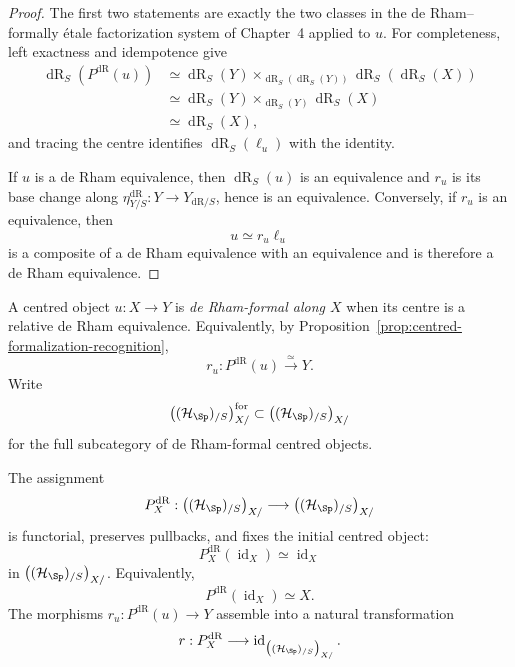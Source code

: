 \begin{proof}
The first two statements are exactly the two classes in the
de Rham--formally \'etale factorization system of Chapter~4 applied to
$u$.  For completeness, left exactness and idempotence give
\[
\begin{aligned}
    \operatorname{dR}_S(P^{\mathrm{dR}}(u))
    &\simeq
    \operatorname{dR}_S(Y)
    \times_{\operatorname{dR}_S(\operatorname{dR}_S(Y))}
    \operatorname{dR}_S(\operatorname{dR}_S(X))\\
    &\simeq
    \operatorname{dR}_S(Y)
    \times_{\operatorname{dR}_S(Y)}
    \operatorname{dR}_S(X)\\
    &\simeq
    \operatorname{dR}_S(X),
\end{aligned}
\]
and tracing the centre identifies
$\operatorname{dR}_S(\ell_u)$ with the identity.

If $u$ is a de Rham equivalence, then
$\operatorname{dR}_S(u)$ is an equivalence and $r_u$ is its base change along
$\eta_{Y/S}^{\mathrm{dR}}:Y\to Y_{\mathrm{dR}/S}$, hence is an equivalence.  Conversely, if
$r_u$ is an equivalence, then
\[
    u\simeq r_u\ell_u
\]
is a composite of a de Rham equivalence with an equivalence and is therefore a
de Rham equivalence.
\end{proof}

\begin{definition}
\label{def:centred-formal-object}
A centred object $u:X\to Y$ is \emph{de Rham-formal along $X$} when its centre
is a relative de Rham equivalence.  Equivalently, by
Proposition~\ref{prop:centred-formalization-recognition},
\[
    r_u:P^{\mathrm{dR}}(u)\xrightarrow{\simeq}Y.
\]
Write
\[
    \bigl((\mathcal H_{\Sp})_{/S}\bigr)_{X/}^{\mathrm{for}}
    \subset
    \bigl((\mathcal H_{\Sp})_{/S}\bigr)_{X/}
\]
for the full subcategory of de Rham-formal centred objects.
\end{definition}

\begin{proposition}
\label{prop:centred-formalization-pullbacks}
The assignment
\[
    P_X^{\mathrm{dR}}:\bigl((\mathcal H_{\Sp})_{/S}\bigr)_{X/}\longrightarrow\bigl((\mathcal H_{\Sp})_{/S}\bigr)_{X/}
\]
is functorial, preserves pullbacks, and fixes the initial centred object:
\[
    P_X^{\mathrm{dR}}(\operatorname{id}_X)
    \simeq
    \operatorname{id}_X
\]
in \(\bigl((\mathcal H_{\Sp})_{/S}\bigr)_{X/}\).  Equivalently,
\[
    P^{\mathrm{dR}}(\operatorname{id}_X)\simeq X.
\]
The morphisms $r_u:P^{\mathrm{dR}}(u)\to Y$ assemble into a natural transformation
\[
    r:P_X^{\mathrm{dR}}\longrightarrow\operatorname{id}_{\bigl((\mathcal H_{\Sp})_{/S}\bigr)_{X/}}.
\]
\end{proposition}

